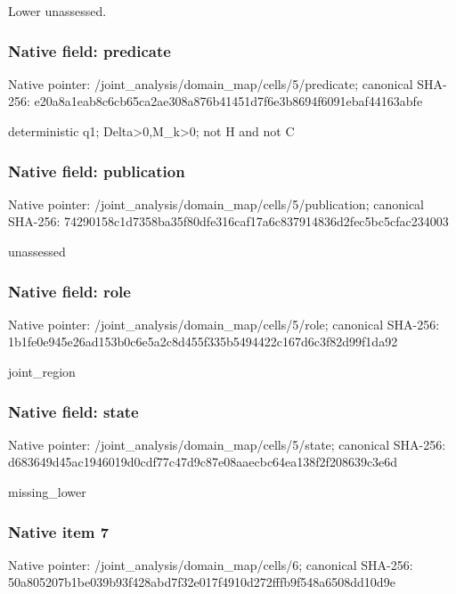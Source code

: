\documentclass[10pt,a4paper]{article}
\begin{document}
\begingroup\raggedright\sloppy Lower unassessed.\par\endgroup

\subsubsection{Native field: predicate}
Native pointer: /joint\_\allowbreak{}analysis/domain\_\allowbreak{}map/cells/5/predicate; canonical SHA-256: e20a8a1eab8c6cb65ca2ae308a876b41451d7f6e3b8694f6091ebaf44163abfe

\begingroup\raggedright\sloppy deterministic q1;\allowbreak{} Delta>0,\allowbreak{}M\_\allowbreak{}k>0;\allowbreak{} not H and not C\par\endgroup

\subsubsection{Native field: publication}
Native pointer: /joint\_\allowbreak{}analysis/domain\_\allowbreak{}map/cells/5/publication; canonical SHA-256: 74290158c1d7358ba35f80dfe316caf17a6c837914836d2fec5bc5cfac234003

\begingroup\raggedright\sloppy unassessed\par\endgroup

\subsubsection{Native field: role}
Native pointer: /joint\_\allowbreak{}analysis/domain\_\allowbreak{}map/cells/5/role; canonical SHA-256: 1b1fe0e945e26ad153b0c6e5a2c8d455f335b5494422c167d6c3f82d99f1da92

\begingroup\raggedright\sloppy joint\_\allowbreak{}region\par\endgroup

\subsubsection{Native field: state}
Native pointer: /joint\_\allowbreak{}analysis/domain\_\allowbreak{}map/cells/5/state; canonical SHA-256: d683649d45ac1946019d0cdf77c47d9c87e08aaecbc64ea138f2f208639c3e6d

\begingroup\raggedright\sloppy missing\_\allowbreak{}lower\par\endgroup

\subsubsection{Native item 7}
Native pointer: /joint\_\allowbreak{}analysis/domain\_\allowbreak{}map/cells/6; canonical SHA-256: 50a805207b1be039b93f428abd7f32e017f4910d272fffb9f548a6508dd10d9e
\end{document}
